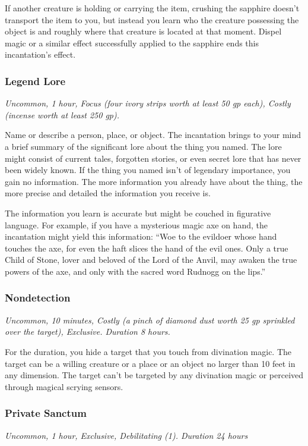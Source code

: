 If another creature is holding or carrying the item, crushing the sapphire doesn't transport the item to you, but instead you learn who the creature possessing the object is and roughly where that creature is located at that moment. Dispel magic or a similar effect successfully applied to the sapphire ends this incantation's effect.

\subsubsection{Legend Lore}
\textit{Uncommon, 1 hour, Focus (four ivory strips worth at least 50 gp each), Costly (incense worth at least 250 gp).}

Name or describe a person, place, or object. The incantation brings to your mind a brief summary of the significant lore about the thing you named. The lore might consist of current tales, forgotten stories, or even secret lore that has never been widely known. If the thing you named isn't of legendary importance, you gain no information. The more information you already have about the thing, the more precise and detailed the information you receive is.

The information you learn is accurate but might be couched in figurative language. For example, if you have a mysterious magic axe on hand, the incantation might yield this information: “Woe to the evildoer whose hand touches the axe, for even the haft slices the hand of the evil ones. Only a true Child of Stone, lover and beloved of the Lord of the Anvil, may awaken the true powers of the axe, and only with the sacred word Rudnogg on the lips.”

\subsubsection{Nondetection}
\textit{Uncommon, 10 minutes, Costly (a pinch of diamond dust worth 25 gp sprinkled over the target), Exclusive. Duration 8 hours.}

For the duration, you hide a target that you touch from divination magic. The target can be a willing creature or a place or an object no larger than 10 feet in any dimension. The target can't be targeted by any divination magic or perceived through magical scrying sensors.

\subsubsection{Private Sanctum}
\textit{Uncommon, 1 hour, Exclusive, Debilitating (1). Duration 24 hours}

